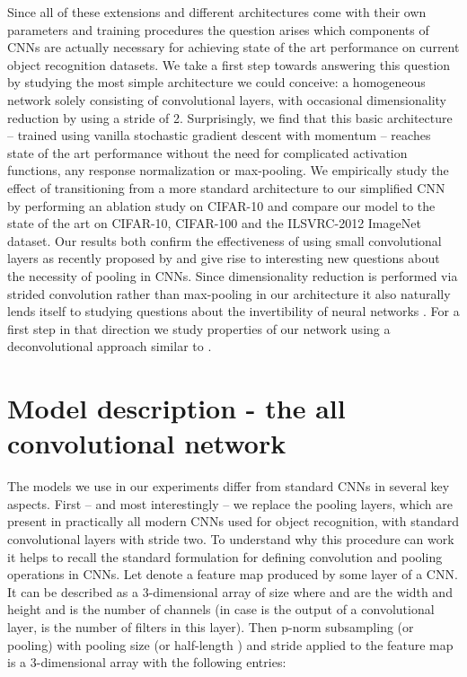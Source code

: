 \documentclass{article} \usepackage{iclr2015,times}
\begin{document}
Since all of these extensions and different architectures come with
their own parameters and training procedures the question arises which
components of CNNs are actually  necessary for achieving
state of the art performance on current object recognition datasets.
We take a first step towards answering this question by
studying the most simple architecture we could conceive: a homogeneous network
solely consisting of convolutional layers, with occasional
dimensionality reduction by using a stride of 2. Surprisingly, we
find that this basic architecture -- trained using vanilla stochastic
gradient descent with momentum -- reaches state of the art
performance without the need
for complicated activation functions, any response normalization or max-pooling. We empirically study
the effect of transitioning from a more standard architecture to our
simplified CNN by performing an ablation study on CIFAR-10 and compare
our model to the state of the art on CIFAR-10, CIFAR-100 and the
ILSVRC-2012 ImageNet dataset. Our results both confirm the effectiveness
of using small convolutional layers as recently proposed by \citet{VGG_2014} and give rise to interesting new
questions about the necessity of pooling in CNNs. Since dimensionality
reduction is performed via strided convolution rather than max-pooling in our
architecture it also naturally lends itself to studying questions about the
invertibility of neural networks \citep{Estrach_2014}. For a first step in
that direction we study properties of our network using a
deconvolutional approach similar to \citet{Zeiler_ECCV2014}.



\section{Model description - the all convolutional network}
\label{sect:model}
The models we use in our experiments differ from standard CNNs in
several key aspects. First -- and most interestingly -- we replace
the pooling layers, which are present in practically all modern CNNs used for object
recognition, with standard convolutional layers with stride two. 
 To understand why this procedure can work it helps to recall the standard
 formulation for defining convolution and pooling operations in
 CNNs. 
Let  denote a feature map produced by some layer of a CNN. It can be described as
 a 3-dimensional array of size  where  and  are the width and
 height and  is the number of channels (in case  is the output of a convolutional layer,  is the number of filters in this layer). 
 Then p-norm subsampling (or pooling) 
 with pooling size  (or half-length ) and stride  applied to the feature map  is a 3-dimensional array  with the following entries:   
 
\end{document}
